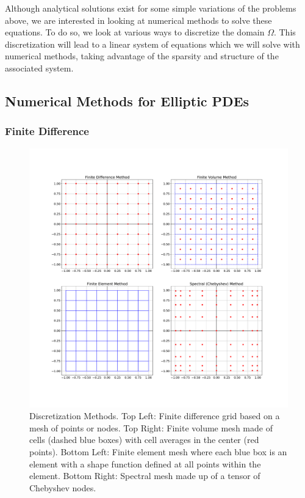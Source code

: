 Although analytical solutions exist for some simple variations of the problems above, we are interested in looking at numerical methods to solve these equations. To do so, we look at various ways to discretize the domain $\Omega$. This discretization will lead to a linear system of equations which we will solve with numerical methods, taking advantage of the sparsity and structure of the associated system.

\subsection{Numerical Methods for Elliptic PDEs}
\label{sec:numerical-methods-for-elliptic-pdes}

\subsubsection{Finite Difference}
\label{subsub:finite-difference}

\begin{figure}
    \centering
    \includegraphics[width=0.8\columnwidth]{figures/PDE_discretization_methods.pdf}
    \caption{Discretization Methods. Top Left: Finite difference grid based on a mesh of points or nodes. Top Right: Finite volume mesh made of cells (dashed blue boxes) with cell averages in the center (red points). Bottom Left: Finite element mesh where each blue box is an element with a shape function defined at all points within the element. Bottom Right: Spectral mesh made up of a tensor of Chebyshev nodes.}
    \label{fig:discretization_methods}
\end{figure}

